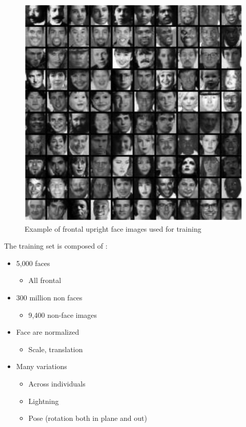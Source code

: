 \begin{figure}[!h]
\begin{center}
\noindent \includegraphics[scale=0.9]{figures/haar_feature_training_dataset} 
\newline
\caption{Example of frontal upright face images used for training}
\label{haar_feature_training_dataset}
\end{center} 
\end{figure}

\noindent The training set is composed of \cite{UBC01}:

\begin{itemize}
  \item 5,000 faces
  \begin{itemize}
  	\item All frontal
  \end{itemize}
  \item 300 million non faces
  \begin{itemize}
  	\item 9,400 non-face images
  \end{itemize}
  \item Face are normalized
  \begin{itemize}
  	\item Scale, translation
  \end{itemize}
  \item Many variations
  \begin{itemize}
  	\item Across individuals
	\item Lightning
	\item Pose (rotation both in plane and out)
  \end{itemize}
\end{itemize}


